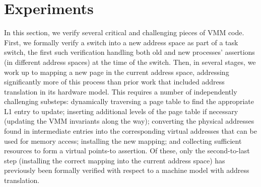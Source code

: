 \section{Experiments}
\label{sec:experiment}
In this section, we verify several critical and challenging pieces of VMM code.
First, we formally verify a switch into a new address space as part of a task switch,
the first such verification handling both old and new processes' assertions (in different address spaces) at the time of the switch.
Then, in several stages, we work up to mapping a new page in the current address space, addressing significantly more of this process than prior
work that included address translation in its hardware model.
This requires a number of independently challenging substeps: dynamically traversing a page table to find
the appropriate L1 entry to update; inserting additional levels of the page table if necessary (updating
the VMM invariants along the way);
converting the physical addresses found in intermediate entries into the corresponding virtual addresses
that can be used for memory access;
installing the new mapping;
and collecting sufficient resources to form a virtual points-to assertion.
Of these, only the second-to-last step (installing the correct mapping into the
current address space) has previously been formally verified with respect to a machine model with address translation.


